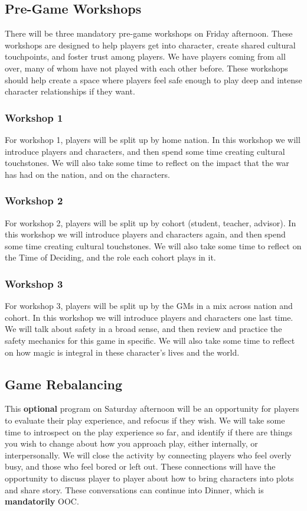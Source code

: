 \documentclass[sheet]{GL2020}
\begin{document}
\subsection{Pre-Game Workshops}
There will be three mandatory pre-game workshops on Friday afternoon. These workshops are designed to help players get into character, create shared cultural touchpoints, and foster trust among players. We have players coming from all over, many of whom have not played with each other before. These workshops should help create a space where players feel safe enough to play deep and intense character relationships if they want.

\subsubsection{Workshop 1}
For workshop 1, players will be split up by home nation. In this workshop we will introduce players and characters, and then spend some time creating cultural touchstones. We will also take some time to reflect on the impact that the war has had on the nation, and on the characters.

\subsubsection{Workshop 2}
For workshop 2, players will be split up by cohort (student, teacher, advisor). In this workshop we will introduce players and characters again, and then spend some time creating cultural touchstones. We will also take some time to reflect on the Time of Deciding, and the role each cohort plays in it.

\subsubsection{Workshop 3}
For workshop 3, players will be split up by the GMs in a mix across nation and cohort. In this workshop we will introduce players and characters one last time. We will talk about safety in a broad sense, and then review and practice the safety mechanics for this game in specific. We will also take some time to reflect on how magic is integral in these character’s lives and the world.

\subsection{Game Rebalancing}
This \textbf{optional} program on Saturday afternoon will be an opportunity for players to evaluate their play experience, and refocus if they wish. We will take some time to introspect on the play experience so far, and identify if there are things you wish to change about how you approach play, either internally, or interpersonally. We will close the activity by connecting players who feel overly busy, and those who feel bored or left out. These connections will have the opportunity to discuss player to player about how to bring characters into plots and share story. These conversations can continue into Dinner, which is \textbf{mandatorily} OOC.
\end{document}
